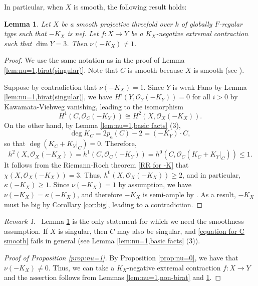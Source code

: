 \documentclass[12pt]{amsart}
\def\le{\leqslant}
\newcommand{\sO}{\mathcal{O}}
\theoremstyle{plain}
\newtheorem{lem}[thm]{Lemma}
\theoremstyle{definition}
\theoremstyle{remark}
\newtheorem{rem}[thm]{Remark}
\newtheorem{defn and notation}[thm]{Definition and Notation}
\theoremstyle{plain}
\begin{document}
In particular, when $X$ is smooth, the following result holds:

\begin{lem}\label{lem:nu=1,birat}
    Let $X$ be a smooth projective threefold over $k$ of globally $F$-regular type such that $-K_X$ is nef.
    Let $f\colon X\to Y$ be a $K_X$-negative extremal  contraction  such that $\dim Y=3$.
    Then $\nu(-K_X)\neq 1$.
\end{lem}
\begin{proof} 
     We use the same notation as in the proof of Lemma \ref{lem:nu=1,birat(singular)}.
    Note that $C$ is smooth because $X$ is smooth (see \cite[Theorem 3.3]{Mori}).  

    Suppose by contradiction that $\nu(-K_X)=1$.
    Since $Y$ is weak Fano by Lemma \ref{lem:nu=1,birat(singular)}, we have $H^i(Y,\sO_Y(-K_Y))=0$ for all $i>0$ by Kawamata-Viehweg vanishing, leading to the isomorphism 
    \[
    H^1(C,\sO_C(-K_Y)) \cong H^2(X,\sO_X(-K_X)). 
    \]
    On the other hand, by Lemma \ref{lem:nu=1,basic facts} (3), 
    \begin{equation}\label{equation for C smooth}      
   \deg K_C=2p_a(C)-2=(-K_Y)\cdot C, 
    \end{equation}
    so that $\deg(K_C+K_Y|_C)=0$. 
    Therefore, 
\[
    h^2(X, \sO_X(-K_X)) = h^1(C,\sO_C(-K_Y))=h^0(C,\sO_C(K_C+K_Y|_C)) \le 1.
\]
It follows from the Riemann-Roch theorem \eqref{RR for -K} that $\chi(X, \sO_X(-K_X))=3$.  
Thus, $h^0(X,\sO_X(-K_X))\geq 2$, and in particular, $\kappa(-K_X)\geq 1$.
Since $\nu(-K_X)=1$ by assumption, we have $\nu(-K_X)=\kappa(-K_X)$, and therefore $-K_X$ is semi-ample by \cite[Theorem 6.1]{Kawamata(gooddivisors)}.
As a result, $-K_X$ must be big by Corollary \ref{cor:big}, leading to a contradiction. 
\end{proof}

\begin{rem}\label{smoothness rem}\,
Lemma \ref{lem:nu=1,birat} is the only statement for which we need the smoothness assumption. If $X$ is singular, then $C$ may also be singular, and \eqref{equation for C smooth} fails in general (see Lemma \ref{lem:nu=1,basic facts} (3)). 
\end{rem}





\begin{proof}[Proof of Proposition \ref{prop:nu=1}]
    By Proposition \ref{prop:nu=0}, we have that $\nu(-K_X)\neq 0$. Thus, we can take a $K_X$-negative extremal  contraction $f\colon X\to Y$ and the assertion follows from Lemmas \ref{lem:nu=1,non-birat} and \ref{lem:nu=1,birat}.
\end{proof}
\end{document}
